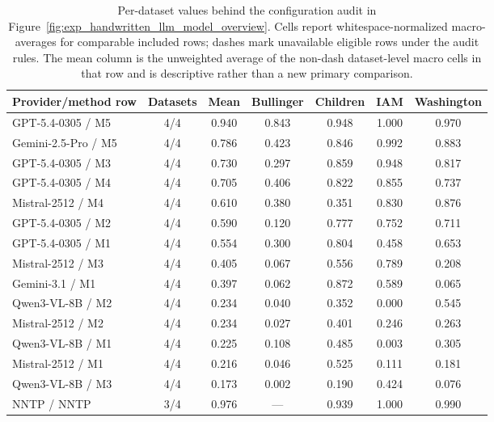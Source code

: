 \begin{landscape}
\begin{table}[p]
  \centering
  \caption{Per-dataset values behind the configuration audit in Figure~\ref{fig:exp_handwritten_llm_model_overview}. Cells report whitespace-normalized \LANormCombined{} macro-averages for comparable included rows; dashes mark unavailable eligible rows under the audit rules. The mean column is the unweighted average of the non-dash dataset-level macro cells in that row and is descriptive rather than a new primary comparison.}
  \label{tab:app_handwritten_model_method_overview_values}
  \scriptsize
  \renewcommand{\arraystretch}{1.03}
  \setlength{\tabcolsep}{4pt}
  \begin{tabular}{@{}l c c c c c c@{}}
    \toprule
    \textbf{Provider/method row} & \textbf{Datasets} & \textbf{Mean} & \textbf{Bullinger} & \textbf{Children} & \textbf{IAM} & \textbf{Washington} \\
    \midrule
    GPT-5.4-0305 / M5 & 4/4 & 0.940 & 0.843 & 0.948 & 1.000 & 0.970 \\
    Gemini-2.5-Pro / M5 & 4/4 & 0.786 & 0.423 & 0.846 & 0.992 & 0.883 \\
    GPT-5.4-0305 / M3 & 4/4 & 0.730 & 0.297 & 0.859 & 0.948 & 0.817 \\
    GPT-5.4-0305 / M4 & 4/4 & 0.705 & 0.406 & 0.822 & 0.855 & 0.737 \\
    Mistral-2512 / M4 & 4/4 & 0.610 & 0.380 & 0.351 & 0.830 & 0.876 \\
    GPT-5.4-0305 / M2 & 4/4 & 0.590 & 0.120 & 0.777 & 0.752 & 0.711 \\
    GPT-5.4-0305 / M1 & 4/4 & 0.554 & 0.300 & 0.804 & 0.458 & 0.653 \\
    Mistral-2512 / M3 & 4/4 & 0.405 & 0.067 & 0.556 & 0.789 & 0.208 \\
    Gemini-3.1 / M1 & 4/4 & 0.397 & 0.062 & 0.872 & 0.589 & 0.065 \\
    Qwen3-VL-8B / M2 & 4/4 & 0.234 & 0.040 & 0.352 & 0.000 & 0.545 \\
    Mistral-2512 / M2 & 4/4 & 0.234 & 0.027 & 0.401 & 0.246 & 0.263 \\
    Qwen3-VL-8B / M1 & 4/4 & 0.225 & 0.108 & 0.485 & 0.003 & 0.305 \\
    Mistral-2512 / M1 & 4/4 & 0.216 & 0.046 & 0.525 & 0.111 & 0.181 \\
    Qwen3-VL-8B / M3 & 4/4 & 0.173 & 0.002 & 0.190 & 0.424 & 0.076 \\
    \midrule
    NNTP / NNTP & 3/4 & 0.976 & --- & 0.939 & 1.000 & 0.990 \\

\end{tabular}
\end{table}
\end{landscape}
